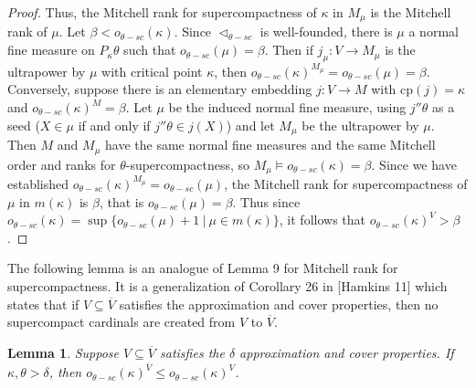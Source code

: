 \documentclass[10pt,leqno]{amsart}
\newtheorem{lemma}[theorem]{Lemma}
\begin{document}
\begin{proof}
Thus, the Mitchell rank for supercompactness of $\kappa$ in $M_{\mu}$ is the Mitchell rank of $\mu$. Let $\beta < o_{\theta-sc}(\kappa)$. Since $\vartriangleleft_{\theta-sc}$ is well-founded, there is $\mu$ a normal fine measure on $P_{\kappa}\theta$ such that $o_{\theta-sc}(\mu) = \beta$. Then if $j_{\mu}:V \to M_{\mu}$ is the ultrapower by $\mu$ with critical point $\kappa$, then $o_{\theta-sc}(\kappa)^{M_{\mu}} = o_{\theta-sc}(\mu) = \beta$. Conversely, suppose there is an elementary embedding $j:V \to M$ with cp$(j) = \kappa$ and $o_{\theta-sc}(\kappa)^M = \beta$. Let $\mu$ be the induced normal fine measure, using $j''\theta$ as a seed ($X \in \mu$ if and only if $j''\theta \in j(X)$) and let $M_{\mu}$ be the ultrapower by $\mu$. Then $M$ and $M_{\mu}$ have the same normal fine measures and the same Mitchell order and ranks for $\theta$-supercompactness, so $M_{\mu} \models o_{\theta-sc}(\kappa) = \beta$. Since we have established $o_{\theta-sc}(\kappa)^{M_{\mu}} = o_{\theta-sc}(\mu)$, the Mitchell rank for supercompactness of $\mu$ in $m(\kappa)$ is $\beta$, that is $o_{\theta-sc}(\mu) = \beta$. Thus since $o_{\theta-sc}(\kappa) = \sup\{o_{\theta-sc}(\mu) + 1 \ | \ \mu \in m(\kappa) \}$, it follows that $o_{\theta-sc}(\kappa)^V > \beta$. 
\end{proof}

The following lemma is an analogue of Lemma 9 for Mitchell rank for supercompactness. It is a generalization of Corollary 26 in [Hamkins 11] which states that if $V \subseteq \overline{V}$ satisfies the approximation and cover properties, then no supercompact cardinals are created from $V$ to $\overline{V}$. 

\begin{lemma} Suppose $V \subseteq \overline{V}$ satisfies the $\delta$ approximation and cover properties. If $\kappa, \theta > \delta$, then $o_{\theta-sc}(\kappa)^{\overline{V}} \le o_{\theta-sc}(\kappa)^V$.
\end{lemma}
\end{document}
